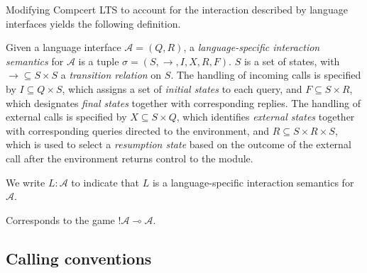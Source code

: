 Modifying Compcert LTS to account for
the interaction described by language interfaces
yields the following definition.

\begin{definition}
Given a language interface $\mathcal{A} = (Q, R)$,
a \emph{language-specific interaction semantics} for $\mathcal{A}$
is a tuple $\sigma = (S, \rightarrow, I, X, R, F)$.
$S$ is a set of states,
with ${\rightarrow} \subseteq S \times S$ a \emph{transition relation} on $S$.
The handling of incoming calls is specified by
$I \subseteq Q \times S$, which
assigns a set of \emph{initial states} to each query, and
$F \subseteq S \times R$,
which designates \emph{final states} together with corresponding replies.
The handling of external calls is specified by
$X \subseteq S \times Q$,
which identifies \emph{external states} together with
corresponding queries directed to the environment, and
$R \subseteq S \times R \times S$,
which is used to select a \emph{resumption state}
based on the outcome of the external call
after the environment returns control to the module.

We write $L : \mathcal{A}$ to indicate that
$L$ is a language-specific interaction semantics for $\mathcal{A}$.
\end{definition}

Corresponds to the game $!\mathcal{A} \multimap \mathcal{A}$.


\subsection{Calling conventions} \label{sec:callconv} %

